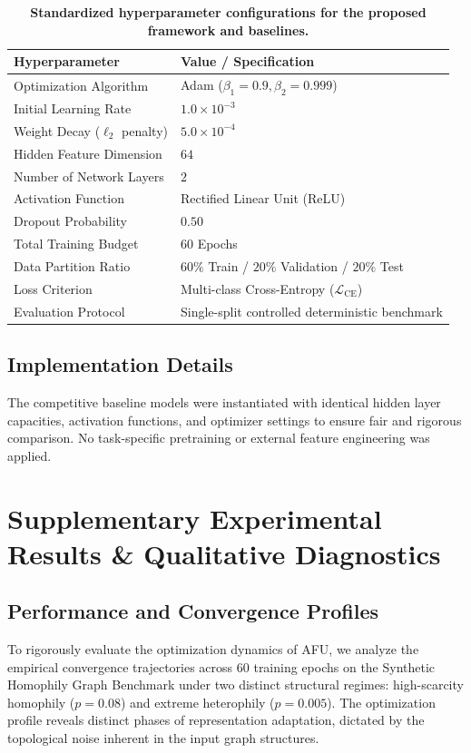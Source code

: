 \documentclass[10pt,twocolumn]{article}
\begin{document}
\begin{table}[t]
\centering
\caption{\textbf{Standardized hyperparameter configurations for the proposed framework and baselines.}}
\begin{tabular}{ll}
\toprule
\textbf{Hyperparameter} & \textbf{Value / Specification} \\
\midrule
Optimization Algorithm & Adam ($\beta_1 = 0.9, \beta_2 = 0.999$) \\
Initial Learning Rate & $1.0 \times 10^{-3}$ \\
Weight Decay ($\ell_2$ penalty) & $5.0 \times 10^{-4}$ \\
Hidden Feature Dimension & $64$ \\
Number of Network Layers & $2$ \\
Activation Function & Rectified Linear Unit (ReLU) \\
Dropout Probability & $0.50$ \\
Total Training Budget & $60$ Epochs \\
Data Partition Ratio & $60\%$ Train / $20\%$ Validation / $20\%$ Test \\
Loss Criterion & Multi-class Cross-Entropy ($\mathcal{L}_{\mathrm{CE}}$) \\
Evaluation Protocol & Single-split controlled deterministic benchmark \\
\bottomrule
\end{tabular}
\label{tab:hyperparameters}
\end{table}

\subsection{Implementation Details}
The competitive baseline models were instantiated with identical hidden layer capacities, activation functions, and optimizer settings to ensure fair and rigorous comparison. No task-specific pretraining or external feature engineering was applied.

\section{Supplementary Experimental Results \& Qualitative Diagnostics}
\subsection{Performance and Convergence Profiles}

To rigorously evaluate the optimization dynamics of \textsc{AFU}, we analyze the empirical convergence trajectories across 60 training epochs on the Synthetic Homophily Graph Benchmark under two distinct structural regimes: high-scarcity homophily ($p = 0.08$) and extreme heterophily ($p = 0.005$). The optimization profile reveals distinct phases of representation adaptation, dictated by the topological noise inherent in the input graph structures.
\end{document}
